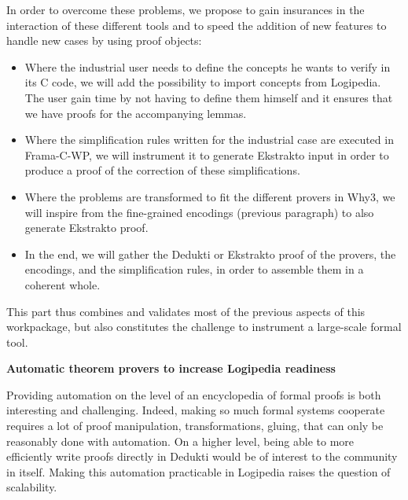 In order to overcome these problems, we propose to gain insurances in
the interaction of these different tools and to speed the addition of
new features to handle new cases by using proof objects:
\begin{itemize}
\item Where the industrial user needs to define the concepts he wants to
  verify in its C code, we will add the possibility to import concepts
  from Logipedia. The user gain time by not having to define them
  himself and it ensures that we have proofs for the accompanying
  lemmas.
\item Where the simplification rules written for the industrial case are
  executed in Frama-C-WP, we will instrument it to generate Ekstrakto
  input in order to produce a proof of the correction of these
  simplifications.
\item Where the problems are transformed to fit the different provers in
  Why3, we will inspire from the fine-grained encodings (previous
  paragraph) to also generate Ekstrakto proof.
\item In the end, we will gather the Dedukti or Ekstrakto proof of the
  provers, the encodings, and the simplification rules, in order to
  assemble them in a coherent whole.
\end{itemize}
This part thus combines and validates most of the previous aspects of
this workpackage, but also constitutes the challenge to instrument a
large-scale formal tool.

\medskip

\noindent
{\bf \large Automatic theorem provers to increase Logipedia readiness}

Providing automation on the level of an encyclopedia of formal proofs is
both interesting and challenging. Indeed, making so much formal systems
cooperate requires a lot of proof manipulation, transformations, gluing,
that can only be reasonably done with automation. On a higher level,
being able to more efficiently write proofs directly in Dedukti would be
of interest to the community in itself. Making this automation
practicable in Logipedia raises the question of scalability.


